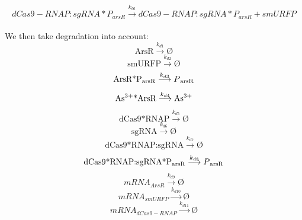 \begin{equation}
dCas9-RNAP:sgRNA*P_{arsR}\stackrel{k_{b6}}{\longrightarrow} dCas9-RNAP:sgRNA*P_{arsR}+smURFP
\end{equation}
\\
We then take degradation into account:\\
\begin{equation}
\text{ArsR}\stackrel{k_{d1}}{\longrightarrow}Ø
\end{equation}
\begin{equation}
\text{smURFP}\stackrel{k_{d2}}{\longrightarrow}Ø
\end{equation}
\begin{equation}
\text{ArsR*P\textsubscript{arsR}}\stackrel{k_{d3}}{\longrightarrow} P\textsubscript{arsR}
\end{equation}
\begin{equation}
\text{As\textsuperscript{3+}*ArsR} \stackrel{k_{d4}}{\longrightarrow}\text{As\textsuperscript{3+}}
\end{equation}
\begin{equation}
\text{dCas9*RNAP}\stackrel{k_{d5}}{\longrightarrow}Ø
\end{equation}
\begin{equation}
\text{sgRNA}\stackrel{k_{d6}}{\longrightarrow}Ø
\end{equation}
\begin{equation}
\text{dCas9*RNAP:sgRNA}\stackrel{k_{d7}}{\longrightarrow}Ø
\end{equation}
\begin{equation}
\text{dCas9*RNAP:sgRNA*P\textsubscript{arsR}}\stackrel{k_{d8}}{\longrightarrow}P\textsubscript{arsR}
\end{equation}
\begin{equation}
mRNA_{ArsR}\stackrel{k_{d9}}{\longrightarrow}Ø
\end{equation}
\begin{equation}
mRNA_{smURFP}\stackrel{k_{d10}}{\longrightarrow}Ø
\end{equation}
\begin{equation}
mRNA_{dCas9-RNAP}\stackrel{k_{d11}}{\longrightarrow}Ø
\end{equation}
\\
